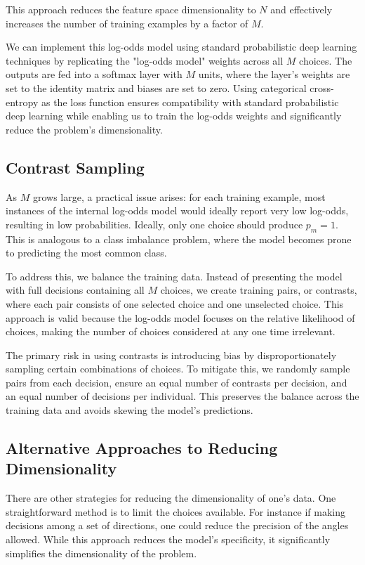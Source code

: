 \documentclass[11pt]{article}
\begin{document}
This approach reduces the feature space dimensionality to $N$ and effectively increases the number of training examples by a factor of $M$.

We can implement this log-odds model using standard probabilistic deep learning techniques by replicating the "log-odds model" weights across all $M$ choices. The outputs are fed into a softmax layer with $M$ units, where the layer's weights are set to the identity matrix and biases are set to zero. Using categorical cross-entropy as the loss function ensures compatibility with standard probabilistic deep learning while enabling us to train the log-odds weights and significantly reduce the problem's dimensionality.

\subsection*{Contrast Sampling}

As $M$ grows large, a practical issue arises: for each training example, most instances of the internal log-odds model would ideally report very low log-odds, resulting in low probabilities. Ideally, only one choice should produce $p_m=1$. This is analogous to a class imbalance problem, where the model becomes prone to predicting the most common class.

To address this, we balance the training data. Instead of presenting the model with full decisions containing all $M$ choices, we create training pairs, or contrasts, where each pair consists of one selected choice and one unselected choice. This approach is valid because the log-odds model focuses on the relative likelihood of choices, making the number of choices considered at any one time irrelevant.

The primary risk in using contrasts is introducing bias by disproportionately sampling certain combinations of choices. To mitigate this, we randomly sample pairs from each decision, ensure an equal number of contrasts per decision, and an equal number of decisions per individual. This preserves the balance across the training data and avoids skewing the model's predictions.

\subsection*{Alternative Approaches to Reducing Dimensionality}
There are other strategies for reducing the dimensionality of one's data. One straightforward method is to limit the choices available. For instance if making decisions among a set of directions, one could reduce the precision of the angles allowed. While this approach reduces the model's specificity, it significantly simplifies the dimensionality of the problem.
\end{document}
